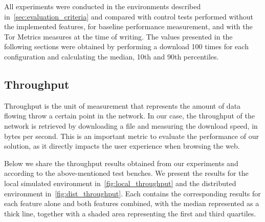 All experiments were conducted in the environments described in~\autoref{sec:evaluation_criteria} and compared with control tests performed without the implemented features, for baseline performance measurement, and with the Tor Metrics measures at the time of writing. The values presented in the following sections were obtained by performing a download 100 times for each configuration and calculating the median, 10th and 90th percentiles.

\subsection{Throughput}
Throughput is the unit of measurement that represents the amount of data flowing throw a certain point in the network. In our case, the throughput of the network is retrieved by downloading a file and measuring the download speed, in bytes per second. This is an important metric to evaluate the performance of our solution, as it directly impacts the user experience when browsing the web.

Below we share the throughput results obtained from our experiments and according to the above-mentioned test benches. We present the results for the local simulated environment in~\autoref{fig:local_throughput} and the distributed environment in~\autoref{fig:dist_throughput}. Each contains the corresponding results for each feature alone and both features combined, with the median represented as a thick line, together with a shaded area representing the first and third quartiles.


